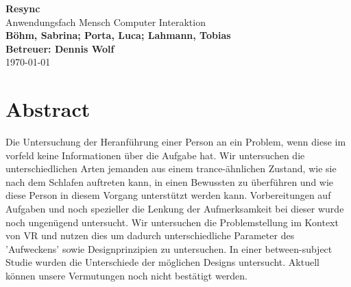 \documentclass[a4paper, 11pt]{article}
\newcommand{\projectName}{Resync}
\begin{document}
\begin{center}
	\textbf{\LARGE{\projectName}}\\
    \large{Anwendungsfach Mensch Computer Interaktion}\\
	\vspace{7mm}
    \textbf{\large{Böhm, Sabrina; Porta, Luca; Lahmann, Tobias}}\\
	\textbf{\large{Betreuer: Dennis Wolf}}\\
	\today
\end{center}

\section*{Abstract}
Die Untersuchung der Heranführung einer Person an ein Problem, wenn diese im vorfeld keine Informationen über die Aufgabe hat. %
Wir untersuchen die unterschiedlichen Arten jemanden aus einem trance-ähnlichen Zustand, wie sie nach dem Schlafen auftreten kann, in einen Bewussten zu überführen und wie diese Person in diesem Vorgang unterstützt werden kann. %
Vorbereitungen auf Aufgaben und noch spezieller die Lenkung der Aufmerksamkeit bei dieser wurde noch ungenügend untersucht. %
Wir untersuchen die Problemstellung im Kontext von VR und nutzen dies um dadurch unterschiedliche Parameter des 'Aufweckens' sowie Designprinzipien zu untersuchen. %
In einer between-subject Studie wurden die Unterschiede der möglichen Designs untersucht. %
Aktuell können unsere Vermutungen noch nicht bestätigt werden. %
\end{document}
